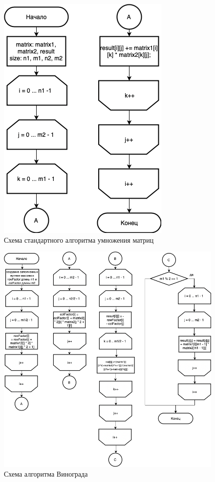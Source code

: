 \documentclass[12pt]{report}
\begin{document}
\begin{figure}[h!p]
	\centering
	\includegraphics[scale = 0.55]{report_files/base.drawio.png}
	\caption{Схема стандартного алгоритма умножения матриц}
	\label{fig:base}
\end{figure}
\begin{figure}[h!p]
	\centering
	\includegraphics[scale = 0.65]{report_files/vin.drawio.png}
	\caption{Схема алгоритма Винограда}
	\label{fig:grapes}
\end{figure}
\end{document}
